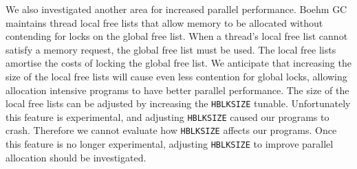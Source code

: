 We also investigated another area for increased parallel performance.
Boehm GC maintains thread local free lists that allow memory to be allocated
without contending for locks on the global free list.
When a thread's local free list cannot satisfy a memory request, the global
free list must be used.
The local free lists amortise the costs of locking the global free list.
We anticipate that increasing the size of the local free lists will cause even
less contention for global locks,
allowing allocation intensive programs to have better parallel
performance.
The size of the local free lists can be adjusted by increasing the
\texttt{HBLKSIZE} tunable.
Unfortunately this feature is experimental,
and adjusting \texttt{HBLKSIZE} caused our programs to crash.
Therefore we cannot evaluate how \texttt{HBLKSIZE} affects our
programs.
Once this feature is no longer experimental,
adjusting \texttt{HBLKSIZE} to improve parallel allocation should be
investigated.

